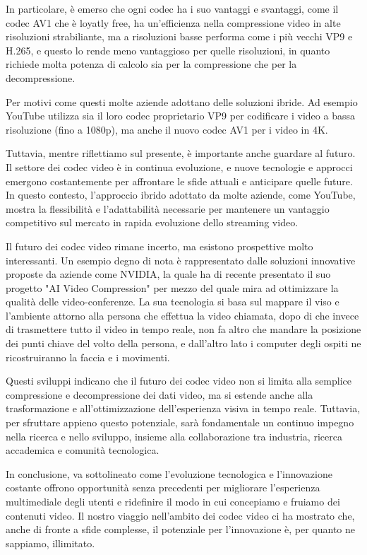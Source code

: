 \documentclass[a4paper,12pt, oneside]{article}
\begin{document}
In particolare, è emerso che ogni codec ha i suo vantaggi e svantaggi, come il codec AV1 che è loyatly
free, ha un'efficienza nella compressione video in alte risoluzioni strabiliante, ma a risoluzioni
basse performa come i più vecchi VP9 e H.265, e questo lo rende meno vantaggioso per quelle risoluzioni, in quanto
richiede molta potenza di calcolo sia per la compressione che per la decompressione.

Per motivi come questi molte aziende adottano delle soluzioni ibride. Ad esempio YouTube utilizza
sia il loro codec proprietario VP9 per codificare i video a bassa risoluzione (fino a 1080p), ma anche
il nuovo codec AV1 per i video in 4K.

Tuttavia, mentre riflettiamo sul presente, è importante anche guardare al futuro. Il settore dei codec
video è in continua evoluzione, e nuove tecnologie e approcci emergono costantemente per affrontare le
sfide attuali e anticipare quelle future. In questo contesto, l'approccio ibrido adottato da molte aziende,
come YouTube, mostra la flessibilità e l'adattabilità necessarie per mantenere un vantaggio
competitivo sul mercato in rapida evoluzione dello streaming video.

Il futuro dei codec video rimane incerto, ma esistono prospettive molto interessanti. Un esempio degno
di nota è rappresentato dalle soluzioni innovative proposte da aziende come NVIDIA, la quale ha di
recente presentato il suo progetto "AI Video Compression" per mezzo del quale mira ad ottimizzare la qualità
delle video-conferenze. La sua tecnologia si basa sul mappare il viso e l'ambiente attorno alla persona
che effettua la video chiamata, dopo di che invece di trasmettere tutto il video in tempo reale, non
fa altro che mandare la posizione dei punti chiave del volto della persona, e dall'altro lato
i computer degli ospiti ne ricostruiranno la faccia e i movimenti.

Questi sviluppi indicano che il futuro dei codec video non si limita alla semplice compressione e
decompressione dei dati video, ma si estende anche alla trasformazione e all'ottimizzazione dell'esperienza
visiva in tempo reale. Tuttavia, per sfruttare appieno questo potenziale, sarà fondamentale un continuo
impegno nella ricerca e nello sviluppo, insieme alla collaborazione tra industria, ricerca accademica
e comunità tecnologica.

In conclusione, va sottolineato come l'evoluzione tecnologica e l'innovazione
costante offrono opportunità senza precedenti per migliorare l'esperienza multimediale degli utenti
e ridefinire il modo in cui concepiamo e fruiamo dei contenuti video. Il nostro viaggio nell'ambito
dei codec video ci ha mostrato che, anche di fronte a sfide complesse, il potenziale per l'innovazione
è, per quanto ne sappiamo, illimitato.
\end{document}
